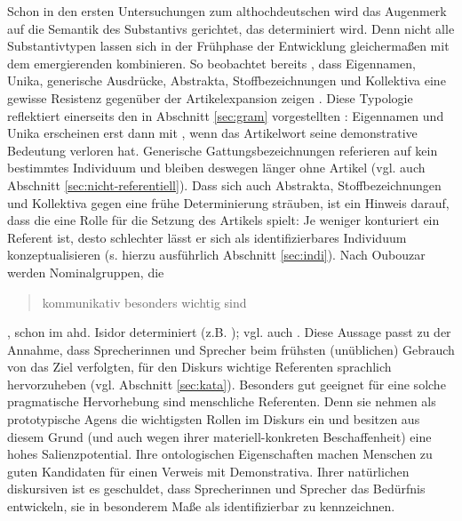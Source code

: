 Schon in den ersten Untersuchungen zum althochdeutschen  wird das Augenmerk auf die Semantik des Substantivs gerichtet, das determiniert wird. Denn nicht alle Substantivtypen lassen sich in der Frühphase der Entwicklung gleichermaßen mit dem emergierenden  kombinieren. So beobachtet bereits \textcite{Graf1905}, dass  Eigennamen,  Unika, generische  Ausdrücke,  Abstrakta, Stoffbezeichnungen und Kollektiva  eine gewisse Resistenz gegenüber der Artikelexpansion  zeigen \parencite[ähnlich][]{Bell1907, Hodler1954}. Diese Typologie reflektiert einerseits den in Abschnitt \ref{sec:gram} vorgestellten : Eigennamen  und Unika  erscheinen erst dann mit , wenn das Artikelwort seine demonstrative Bedeutung verloren hat. Generische Gattungsbezeichnungen referieren auf kein bestimmtes Individuum und bleiben deswegen länger ohne Artikel (vgl. auch Abschnitt \ref{sec:nicht-referentiell}). Dass sich auch  Abstrakta, Stoffbezeichnungen  und Kollektiva  gegen eine frühe Determinierung sträuben, ist ein Hinweis darauf, dass die  eine Rolle für die Setzung des Artikels spielt: Je weniger konturiert ein Referent ist, desto schlechter lässt er sich als identifizierbares Individuum konzeptualisieren (s. hierzu ausführlich Abschnitt \ref{sec:indi}). 
Nach Oubouzar werden Nominalgruppen, die \blockcquote[75]{Oubouzar1992}{kommunikativ besonders wichtig sind}, schon im ahd. Isidor determiniert (z.B.  ); vgl. auch \textcite[][117--118]{Oubouzar1989}.  
Diese Aussage passt zu der Annahme, dass Sprecherinnen  und Sprecher beim frühsten (unüblichen) Gebrauch von  das Ziel verfolgten, für den Diskurs wichtige Referenten sprachlich hervorzuheben (vgl. Abschnitt \ref{sec:kata}). 
Besonders gut geeignet für eine solche pragmatische Hervorhebung sind menschliche Referenten. Denn sie nehmen als prototypische Agens 
 die wichtigsten Rollen  im Diskurs ein und besitzen aus diesem Grund (und auch wegen ihrer materiell-konkreten Beschaffenheit) eine hohes Salienzpotential. Ihre ontologischen Eigenschaften machen Menschen zu guten Kandidaten für einen Verweis mit  Demonstrativa. Ihrer natürlichen diskursiven  ist es geschuldet, dass Sprecherinnen und Sprecher das Bedürfnis entwickeln, sie in besonderem Maße als identifizierbar zu kennzeichnen. 
